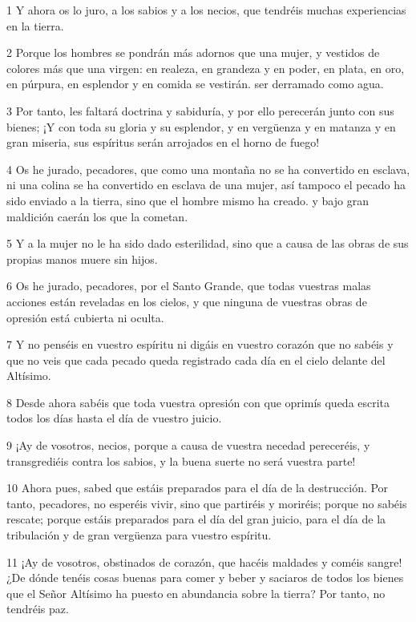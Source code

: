 \par 1 Y ahora os lo juro, a los sabios y a los necios, que tendréis muchas experiencias en la tierra.
\par 2 Porque los hombres se pondrán más adornos que una mujer, y vestidos de colores más que una virgen: en realeza, en grandeza y en poder, en plata, en oro, en púrpura, en esplendor y en comida se vestirán. ser derramado como agua.
\par 3 Por tanto, les faltará doctrina y sabiduría, y por ello perecerán junto con sus bienes; ¡Y con toda su gloria y su esplendor, y en vergüenza y en matanza y en gran miseria, sus espíritus serán arrojados en el horno de fuego!
\par 4 Os he jurado, pecadores, que como una montaña no se ha convertido en esclava, ni una colina se ha convertido en esclava de una mujer, así tampoco el pecado ha sido enviado a la tierra, sino que el hombre mismo ha creado. y bajo gran maldición caerán los que la cometan.
\par 5 Y a la mujer no le ha sido dado esterilidad, sino que a causa de las obras de sus propias manos muere sin hijos.
\par 6 Os he jurado, pecadores, por el Santo Grande, que todas vuestras malas acciones están reveladas en los cielos, y que ninguna de vuestras obras de opresión está cubierta ni oculta.
\par 7 Y no penséis en vuestro espíritu ni digáis en vuestro corazón que no sabéis y que no veis que cada pecado queda registrado cada día en el cielo delante del Altísimo.
\par 8 Desde ahora sabéis que toda vuestra opresión con que oprimís queda escrita todos los días hasta el día de vuestro juicio.
\par 9 ¡Ay de vosotros, necios, porque a causa de vuestra necedad pereceréis, y transgrediéis contra los sabios, y la buena suerte no será vuestra parte!
\par 10 Ahora pues, sabed que estáis preparados para el día de la destrucción. Por tanto, pecadores, no esperéis vivir, sino que partiréis y moriréis; porque no sabéis rescate; porque estáis preparados para el día del gran juicio, para el día de la tribulación y de gran vergüenza para vuestro espíritu.
\par 11 ¡Ay de vosotros, obstinados de corazón, que hacéis maldades y coméis sangre! ¿De dónde tenéis cosas buenas para comer y beber y saciaros de todos los bienes que el Señor Altísimo ha puesto en abundancia sobre la tierra? Por tanto, no tendréis paz.

